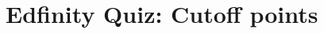 \documentclass[slidestop,compress,mathserif]{beamer}
\begin{document}


\section{Edfinity Quiz: Cutoff points}










\end{document}
